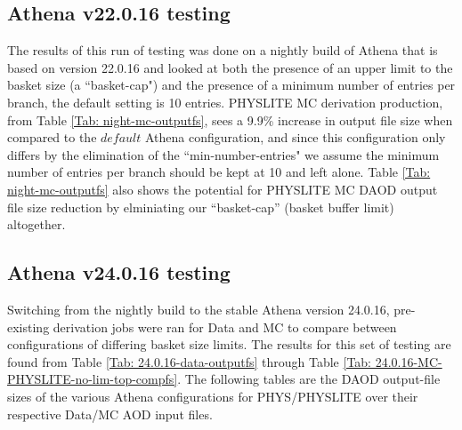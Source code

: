 

\subsection{Athena v22.0.16 testing}
The results of this run of testing was done on a nightly build of Athena that is based on version 22.0.16 and looked at both the presence of an upper limit to the basket size (a ``basket-cap") and the presence of a minimum number of entries per branch, the default setting is 10 entries.
PHYSLITE MC derivation production, from Table \ref{Tab: night-mc-outputfs}, sees a 9.9\% increase in output file size when compared to the $\textit{default}$ Athena configuration, and since this configuration only differs by the elimination of the ``min-number-entries" we assume the minimum number of entries per branch should be kept at 10 and left alone.
Table \ref{Tab: night-mc-outputfs} also shows the potential for PHYSLITE MC DAOD output file size reduction by elminiating our ``basket-cap'' (basket buffer limit) altogether.


\subsection{Athena v24.0.16 testing}
Switching from the nightly build to the stable Athena version 24.0.16, pre-existing derivation jobs were ran for Data and MC to compare between configurations of differing basket size limits.
The results for this set of testing are found from Table \ref{Tab: 24.0.16-data-outputfs} through Table \ref{Tab: 24.0.16-MC-PHYSLITE-no-lim-top-compfs}. 
The following tables are the DAOD output-file sizes of the various Athena configurations for PHYS/PHYSLITE over their respective Data/MC AOD input files.

